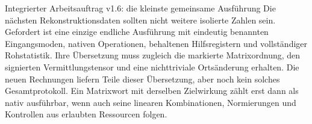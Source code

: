 \begin{bild}{Integrierter Arbeitsauftrag v1.6: die kleinste gemeinsame Ausführung}
Die nächsten Rekonstruktionsdaten sollten nicht weitere isolierte Zahlen sein. Gefordert ist eine einzige endliche Ausführung mit eindeutig benannten Eingangsmoden, nativen Operationen, behaltenen Hilfsregistern und vollständiger Rohstatistik. Ihre Übersetzung muss zugleich die markierte Matrixordnung, den signierten Vermittlungstensor und eine nichttriviale Ortsänderung erhalten. Die neuen Rechnungen liefern Teile dieser Übersetzung, aber noch kein solches Gesamtprotokoll. Ein Matrixwort mit derselben Zielwirkung zählt erst dann als nativ ausführbar, wenn auch seine linearen Kombinationen, Normierungen und Kontrollen aus erlaubten Ressourcen folgen.
\end{bild}
